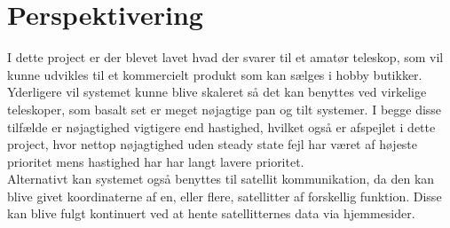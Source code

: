 \section{Perspektivering}

I dette project er der blevet lavet hvad der svarer til et amatør teleskop, som vil kunne udvikles til et kommercielt produkt som kan sælges i hobby butikker. Yderligere vil systemet kunne blive skaleret så det kan benyttes ved virkelige teleskoper, som basalt set er meget nøjagtige pan og tilt systemer. I begge disse tilfælde er nøjagtighed vigtigere end hastighed, hvilket også er afspejlet i dette project, hvor nettop nøjagtighed uden steady state fejl har været af højeste prioritet mens hastighed har har langt lavere prioritet.
\\


Alternativt kan systemet også benyttes til satellit kommunikation, da den kan blive givet koordinaterne af en, eller flere, satellitter af forskellig funktion. Disse kan blive fulgt kontinuert ved at hente satellitternes data via hjemmesider.